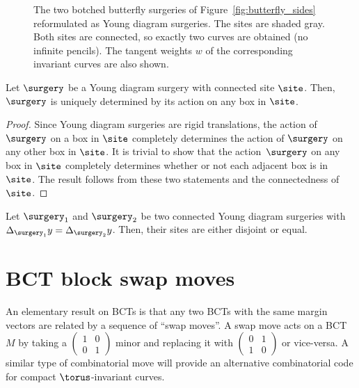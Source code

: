 \begin{figure}
{
}

\caption{The two botched butterfly surgeries of Figure~\ref{fig:butterfly_sides} reformulated as Young diagram surgeries. The sites are shaded gray. Both sites are connected, so exactly two curves are obtained (no infinite pencils). The tangent weights $w$ of the corresponding invariant curves are also shown.}
\label{fig:yd_surgeries}
\end{figure}

\begin{Lemma} \label{lemma:surgery_uniqueness}
Let $\surgery$ be a Young diagram surgery with connected site $\site$. Then, $\surgery$ is uniquely determined by its action on any box in $\site$.
\end{Lemma}
\begin{proof}
Since Young diagram surgeries are rigid translations, the action of $\surgery$ on a box in $\site$ completely determines the action of $\surgery$ on any other box in $\site$. It is trivial to show that the action~$\surgery$ on any box in $\site$ completely determines whether or not each adjacent box is in $\site$. The result follows from these two statements and the connectedness of $\site$.
\end{proof}


\begin{Corollary} \label{cor:disjoint_sites}
Let $\surgery_1$ and $\surgery_2$ be two connected Young diagram surgeries with $\Delta_{\surgery_1}y=\Delta_{\surgery_2}y$. Then, their sites are either disjoint or equal.
\end{Corollary}

\section{BCT block swap moves} \label{sec:block_swap}
An elementary result on BCTs is that any two BCTs with the same margin vectors are related by a sequence of ``swap moves''. A swap move acts on a BCT $M$ by taking a $\left(\begin{smallmatrix} 1 & 0 \\ 0 & 1 \end{smallmatrix}\right)$ minor and replacing it with $\left(\begin{smallmatrix} 0 & 1 \\ 1 & 0 \end{smallmatrix}\right)$ or vice-versa. A similar type of combinatorial move will provide an alternative combinatorial code for compact $\torus$-invariant curves.

